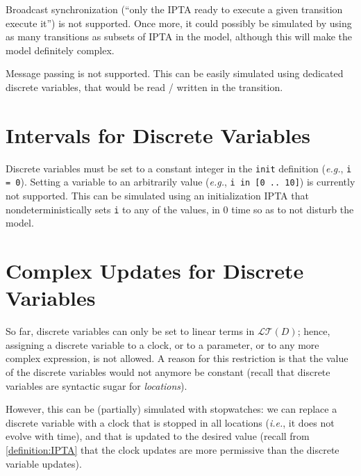 \documentclass[a4paper,11pt]{report}
\newcommand{\DVar}{D} %
\newcommand{\LTerm}{\mathcal{LT}} %
\newcommand{\LTermD}{\LTerm(\DVar)}
\newcommand{\IPTA}{IPTA}
\newcommand{\styleIMI}[1]{\textcolor{imicolor}{\texttt{#1}}}
\newcommand{\eg}{\textcolor{colorok}{\textit{e.g.}, }}
\newcommand{\ie}{\textcolor{colorok}{\textit{i.e.}, }}
\begin{document}


Broadcast synchronization (``only the \IPTA{} ready to execute a given transition execute it'') is not supported.
Once more, it could possibly be simulated by using as many transitions as subsets of \IPTA{} in the model, although this will make the model definitely complex.



Message passing is not supported.
This can be easily simulated using dedicated discrete variables, that would be read / written in the transition.



\section{Intervals for Discrete Variables}

Discrete variables must be set to a constant integer in the \styleIMI{init} definition (\eg{} \styleIMI{i = 0}).
Setting a variable to an arbitrarily value (\eg{} \styleIMI{i in [0 .. 10]}) is currently not supported.
This can be simulated using an initialization \IPTA{} that nondeterministically sets \styleIMI{i} to any of the values, in 0 time so as to not disturb the model.


\section{Complex Updates for Discrete Variables}

So far, discrete variables can only be set to linear terms in $\LTermD$;
hence, assigning a discrete variable to a clock, or to a parameter, or to any more complex expression, is not allowed.
A reason for this restriction is that the value of the discrete variables would not anymore be constant (recall that discrete variables are syntactic sugar for \emph{locations}).

However, this can be (partially) simulated with stopwatches: we can replace a discrete variable with a clock that is stopped in all locations (\ie{} it does not evolve with time), and that is updated to the desired value (recall from \cref{definition:IPTA} that the clock updates are more permissive than the discrete variable updates).
\end{document}
